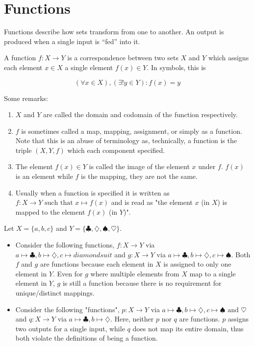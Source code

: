 \section{Functions}

Functions describe how sets transform from one to another. An output is produced when a single input is ``fed'' into it.

\begin{definition} [Function]
    A function  $f : X \to Y$ is a correspondence between two sets $X$ and $Y$ which assigns each element $x \in X$ a single element $f(x) \in Y$. In symbols, this is

    $$
    (\forall x \in X) , (\exists! y \in Y) : f(x) = y
    $$
\end{definition}

\begin{remark} Some remarks:
    \begin{enumerate}
        \item $X$ and $Y$ are called the domain  and codomain  of the function respectively.
        \item $f$ is sometimes called a map, mapping, assignment, or simply as a function. Note that this is an abuse of terminology as, technically, a function is the triple $(X,Y,f)$ which each component specified.
        \item The element $f(x) \in Y$ is called the image  of the element $x$ under $f$. $f(x)$ is an element while $f$ is the mapping, they are not the same.
        \item Usually when a function is specified it is written as $f:X\to Y \text{ such that } x \mapsto f(x)$ and is read as "the element $x$ (in $X$) is mapped to the element $f(x)$ (in $Y$)".
    \end{enumerate}
\end{remark}

\begin{example}
    Let $X = \{a,b,c\}$ and $Y = \{\clubsuit, \diamondsuit, \spadesuit, \heartsuit\}$.
    \begin{itemize}
        \item Consider the following functions, $f : X \to Y$ via $a \mapsto \clubsuit, b \mapsto \diamondsuit, c \mapsto diamondsuit$ and $g : X \to Y$ via $a \mapsto \clubsuit, b \mapsto \diamondsuit, c \mapsto \spadesuit$. Both $f$ and $g$ are functions because each element in $X$ is assigned to only one element in $Y$. Even for $g$ where multiple elements from $X$ map to a single element in $Y$, $g$ is still a function because there is no requirement for unique/distinct mappings. \label{ex:abcsuits_fg}
        \item Consider the following "functions", $p : X \to Y$ via $a \mapsto \clubsuit, b \mapsto \diamondsuit, c \mapsto \spadesuit \text{ and } \heartsuit$ and $q : X \to Y$ via $a \mapsto \clubsuit, b \mapsto \diamondsuit$. Here, neither $p$ nor $q$ are functions. $p$ assigns two outputs for a single input, while $q$ does not map its entire domain, thus both violate the definitions of being a function.
    \end{itemize}
\end{example}


